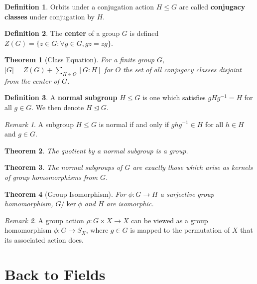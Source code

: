 \documentclass[
    parskip=half,
    toc=flat,
    toc=sectionentrydotfill,
]{scrartcl}  %
\theoremstyle{definition}
\newtheorem{definition}{Definition}[section]
\theoremstyle{plain}
\newtheorem{theorem}{Theorem}[section]
\theoremstyle{remark}
\newtheorem{remark}{Remark}[section]
\begin{document}
\begin{definition}
    Orbits under a conjugation action $H\leq G$ are called
    \textbf{conjugacy classes} under conjugation by $H$.
\end{definition}

\begin{definition}
    The \textbf{center} of a group $G$ is defined
    $Z(G)=\{z\in G:\forall g\in G, gz=zg\}$.
\end{definition}

\begin{theorem}[Class Equation]
    For a finite group $G$, $|G|=Z(G)+\sum_{H\in O}[G:H]$ for $O$ the set of
    all conjugacy classes disjoint from the center of $G$.
\end{theorem}

\begin{definition}
    A \textbf{normal subgroup} $H\leq G$ is one which satisfies $gHg^{-1}=H$
    for all $g\in G$.
    We then denote $H\trianglelefteq G$.
\end{definition}

\begin{remark}
    A subgroup $H\leq G$ is normal if and only if $ghg^{-1}\in H$ for all
    $h\in H$ and $g\in G$.
\end{remark}

\begin{theorem}
    The quotient by a normal subgroup is a group.
\end{theorem}

\begin{theorem}
    The normal subgroups of $G$ are exactly those which arise as kernels of
    group homomorphisms from $G$.
\end{theorem}

\begin{theorem}[Group Isomorphism]
    For $\phi:G\to H$ a surjective group homomorphism, $G/\ker\phi$ and $H$ are
    isomorphic.
\end{theorem}

\begin{remark}
    A group action $\rho:G\times X\to X$ can be viewed as a group homomorphism
    $\phi:G\to S_X$, where $g\in G$ is mapped to the permutation of $X$ that
    its associated action does.
\end{remark}


\section{Back to Fields}
\end{document}
